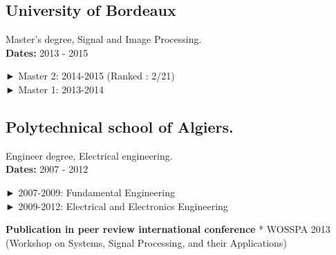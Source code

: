 \documentclass[
]{article}
\begin{document}
\hypertarget{university-of-bordeaux}{%
\subsection{University of Bordeaux}\label{university-of-bordeaux}}

Master's degree, Signal and Image Processing.\\
\textbf{Dates:} 2013 - 2015

► Master 2: 2014-2015 (Ranked : 2/21)\\
► Master 1: 2013-2014

\hypertarget{polytechnical-school-of-algiers.}{%
\subsection{Polytechnical school of
Algiers.}\label{polytechnical-school-of-algiers.}}

Engineer degree, Electrical engineering.\\
\textbf{Dates:} 2007 - 2012

► 2007-2009: Fundamental Engineering\\
► 2009-2012: Electrical and Electronics Engineering

\textbf{Publication in peer review international conference} * WOSSPA
2013 (Workshop on Systems, Signal Processing, and their Applications)
\end{document}
